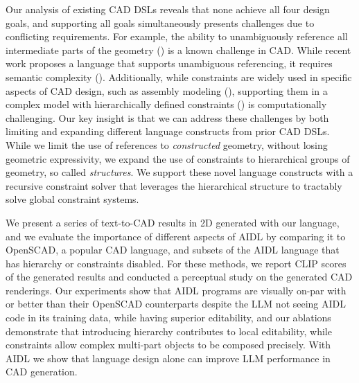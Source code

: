 Our analysis of existing CAD DSLs reveals that none achieve all four design goals, and supporting all goals simultaneously presents challenges due to conflicting requirements. For example, the ability to unambiguously reference all intermediate parts of the geometry (\dgone{}) is a known challenge in CAD. While recent work proposes a language that supports unambiguous referencing, it requires semantic complexity (\dgthree{}). Additionally, while constraints are widely used in specific aspects of CAD design, such as assembly modeling (\dgtwo{}), supporting them in a complex model with hierarchically defined constraints (\dgfour{}) is computationally challenging. 
Our key insight is that we can address these challenges by both limiting and expanding different language constructs from prior CAD DSLs.
While we limit the use of references to \emph{constructed} geometry, without losing geometric expressivity, we expand the use of constraints to hierarchical groups of geometry, so called \emph{structures}. We support these novel language constructs with a recursive constraint solver that leverages the hierarchical structure to tractably solve global constraint systems.

We present a series of text-to-CAD results in 2D generated with our language, and we evaluate the importance of different aspects of AIDL by comparing it to OpenSCAD, a popular CAD language, and subsets of the AIDL language that has hierarchy or constraints disabled. For these methods, we report CLIP scores of the generated results and conducted a perceptual study on the generated CAD renderings. Our experiments show that AIDL programs are visually on-par with or better than their OpenSCAD counterparts despite the LLM not seeing AIDL code in its training data, while having superior editability, and our ablations demonstrate that introducing hierarchy contributes to local editability, while constraints allow complex multi-part objects to be composed precisely. With AIDL we show that language design alone can improve LLM performance in CAD generation.


